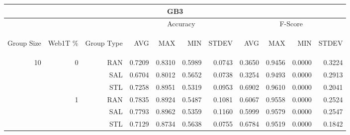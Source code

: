 \begin{center}
\begin{table}[htbp]
\begin{tabular}{ | r | r | r | r | r | r | r | r | r | r | r |}
\hline
\multicolumn{11}{|c|}{GB3}\\
\hline
 & & & \multicolumn{4}{|c|}{Accuracy} & \multicolumn{4}{|c|}{F-Score}\\ \cline{4-11}
\begin{sideways}Group Size\end{sideways} & \begin{sideways}Web1T \%\end{sideways} & \begin{sideways}Group Type\end{sideways} & \begin{sideways}AVG\end{sideways} & \begin{sideways}MAX\end{sideways} & \begin{sideways}MIN\end{sideways} & \begin{sideways}STDEV\end{sideways} & \begin{sideways}AVG\end{sideways} & \begin{sideways}MAX\end{sideways} & \begin{sideways}MIN\end{sideways} & \begin{sideways}STDEV\end{sideways}\\
\hline
\multirow{18}{*}{10}
 & \multirow{3}{*}{0} & RAN & 0.7209 & 0.8310 & 0.5989 & 0.0743 & 0.3650 & 0.9456 & 0.0000 & 0.3224\\ \cline{3-11}
 &   & SAL & 0.6704 & 0.8012 & 0.5652 & 0.0738 & 0.3254 & 0.9493 & 0.0000 & 0.2913\\ \cline{3-11}
 &   & STL & 0.7258 & 0.8951 & 0.5319 & 0.0953 & 0.6902 & 0.9610 & 0.0000 & 0.2041\\ \cline{2-11}
 & \multirow{3}{*}{1} & RAN & 0.7835 & 0.8924 & 0.5487 & 0.1081 & 0.6067 & 0.9558 & 0.0000 & 0.2524\\ \cline{3-11}
 &   & SAL & 0.7793 & 0.8962 & 0.5359 & 0.1160 & 0.5999 & 0.9579 & 0.0000 & 0.2547\\ \cline{3-11}
 &   & STL & 0.7129 & 0.8734 & 0.5638 & 0.0755 & 0.6784 & 0.9519 & 0.0000 & 0.1842\\ \cline{2-11}

\end{tabular}
\end{table}
\end{center}
